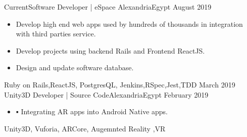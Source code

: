 \begin{experiences}
  \experience
    {Current}{Software Developer | eSpace }{Alexandria}{Egypt}
    {August 2019}   {
                      \begin{itemize}
                        \item Develop high end web apps used by hundreds of thousands in integration with third parties service.
                        \item Develop projects using backend Rails and Frontend ReactJS.
                        \item Design and update software database.
                      \end{itemize}
                    }
                    {Ruby on Rails,ReactJS, PostgresQL, Jenkins,RSpec,Jest,TDD}                    
  \emptySeparator
  \experience
    {March 2019	} {Unity3D Developer  | Source Code}{Alexandria}{Egypt}
    {February 2019	}    {
                      \begin{itemize}
                        \item ▪	Integrating AR apps into Android Native apps.                          
                      \end{itemize}
                    }
                    {Unity3D, Vuforia, ARCore, Augemnted Reality ,VR}
\end{experiences}
